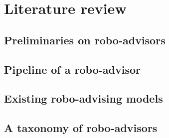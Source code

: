 \chapter{Literature review}
\section{Preliminaries on robo-advisors}
\section{Pipeline of a robo-advisor}
\section{Existing robo-advising models}
\section{A taxonomy of robo-advisors}
